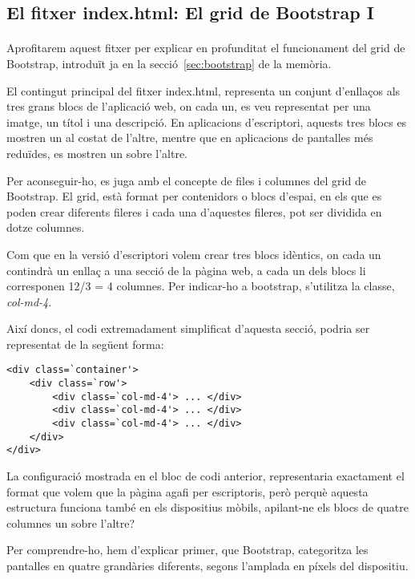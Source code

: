 \subsection{El fitxer index.html: El grid de Bootstrap I}\label{sec:bootstrap1}

    \paragraph{}
    Aprofitarem aquest fitxer per explicar en profunditat el funcionament del grid de Bootstrap, introduït ja en la secció~\ref{sec:bootstrap} de la memòria.

    El contingut principal del fitxer index.html, representa un conjunt d'enllaços als tres grans blocs de l'aplicació web, on cada un, es veu representat per una imatge, un títol i una descripció. En aplicacions d'escriptori, aquests tres blocs es mostren un al costat de l'altre, mentre que en aplicacions de pantalles més reduïdes, es mostren un sobre l'altre.

    Per aconseguir-ho, es juga amb el concepte de files i columnes del grid de Boots\-trap. El grid, està format per contenidors o blocs d'espai, en els que es poden crear diferents fileres i cada una d'aquestes fileres, pot ser dividida en dotze columnes.

    Com que en la versió d'escriptori volem crear tres blocs idèntics, on cada un contindrà un enllaç a una secció de la pàgina web, a cada un dels blocs li corresponen 12/3 = 4 columnes. Per indicar-ho a bootstrap, s'utilitza la classe, \emph{col-md-4}.

    Així doncs, el codi extremadament simplificat d'aquesta secció, podria ser representat de la següent forma:

    \begin{lstlisting}[style=rawOwn,caption={Exemple bàsic de divisió d'una filera en tres columnes}]
<div class=`container'>
    <div class=`row'>
        <div class=`col-md-4'> ... </div>
        <div class=`col-md-4'> ... </div>
        <div class=`col-md-4'> ... </div>
	</div>
</div>
    \end{lstlisting}

    La configuració mostrada en el bloc de codi anterior, representaria exactament el format que volem que la pàgina agafi per escriptoris, però perquè aquesta estructura funciona també en els dispositius mòbils, apilant-ne els blocs de quatre columnes un sobre l'altre?

    Per comprendre-ho, hem d'explicar primer, que Bootstrap, categoritza les pantalles en quatre grandàries diferents, segons l'amplada en píxels del dispositiu.

